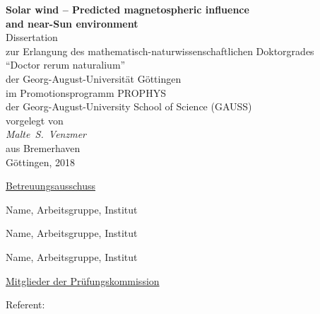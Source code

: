 
\begin{titlepage}
	\begin{center}
		\vspace*{\fill}
		\renewcommand{\baselinestretch}{1.5}
		{\LARGE\sffamily
			\textbf{Solar wind -- Predicted magnetospheric influence\\and near-Sun environment}\\
		}
		\Large\rmfamily
		\vspace{3\baselineskip}
		Dissertation\\
		zur Erlangung des mathematisch-naturwissenschaftlichen Doktorgrades\\
		``Doctor rerum naturalium''\\
		der Georg-August-Universität Göttingen\\
		\vspace{\baselineskip}
		im Promotionsprogramm PROPHYS\\
		der Georg-August-University School of Science (GAUSS)\\
		\vspace{4\baselineskip}
		vorgelegt von\\
		\textit{%
			Malte~S.~Venzmer\\
		}
		aus Bremerhaven\\
		\vspace{4\baselineskip}
		Göttingen, 2018
		\vspace{\baselineskip}
		\vspace{\fill}
	\end{center}
\end{titlepage}

\newpage


\vspace*{\fill}

\noindent \underline{Betreuungsausschuss}
\vspace{\baselineskip}

Name, Arbeitsgruppe, Institut
\vspace{\baselineskip}

Name, Arbeitsgruppe, Institut
\vspace{\baselineskip}

Name, Arbeitsgruppe, Institut
\vspace{3\baselineskip}

\noindent \underline{Mitglieder der Prüfungskommission}
\vspace{\baselineskip}

\noindent Referent:

